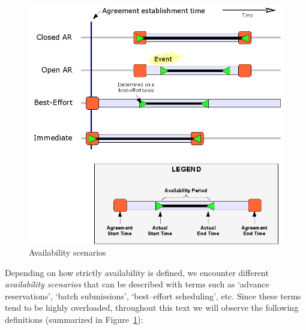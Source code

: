 \begin{figure}
  \begin{center}
    \includegraphics[width=\textwidth]{figures/availability.png}
    \caption{Availability scenarios}
    \label{fig:availability}
  \end{center}
\end{figure}

Depending on how strictly availability is defined, we encounter different \emph{availability scenarios} that can be described with terms such as `advance reservations', `batch submissions', `best--effort scheduling', etc. Since these terms tend to be highly overloaded, throughout this text we will observe the following definitions (summarized in Figure~\ref{fig:availability}):

